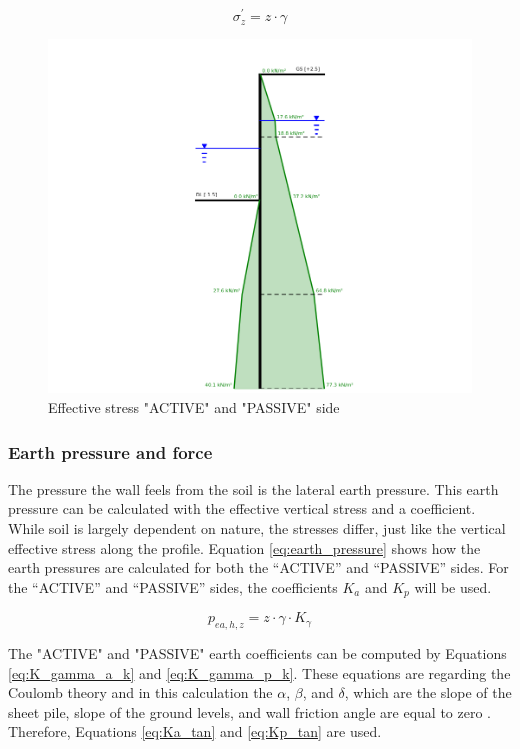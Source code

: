 \begin{equation}
    \sigma^{'}_{z} = z \cdot \gamma
    \label{eq:effective_stress}
\end{equation}

\begin{figure}[H]
    \centering
    \includegraphics[width=0.7\linewidth]{figures/ch8/effective_stress.png}
    \caption{Effective stress "ACTIVE" and "PASSIVE" side}
    \label{fig:effective_stress}
\end{figure}

\subsubsection{Earth pressure and force}

The pressure the wall feels from the soil is the lateral earth pressure. This earth pressure can be calculated with the effective vertical stress and a coefficient. While soil is largely dependent on nature, the stresses differ, just like the vertical effective stress along the profile. Equation \ref{eq:earth_pressure} shows how the earth pressures are calculated for both the “ACTIVE” and “PASSIVE” sides. For the “ACTIVE” and “PASSIVE” sides, the coefficients $K_{a}$ and $K_{p}$ will be used.

\begin{equation}
    p_{ea,h,z} = z \cdot \gamma \cdot K_{\gamma}
    \label{eq:earth_pressure}
\end{equation}

The "ACTIVE" and "PASSIVE" earth coefficients can be computed by Equations \ref{eq:K_gamma_a_k} and \ref{eq:K_gamma_p_k}. These equations are regarding the Coulomb theory and in this calculation the $\alpha$, $\beta$, and $\delta$, which are the slope of the sheet pile, slope of the ground levels, and wall friction angle are equal to zero \autocite{grabeSheetPilingHandbook2008}. Therefore, Equations \ref{eq:Ka_tan} and \ref{eq:Kp_tan} are used.

